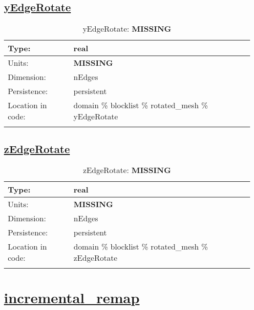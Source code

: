 \subsection[yEdgeRotate]{\hyperref[sec:var_tab_rotated_mesh]{yEdgeRotate}}
\label{subsec:var_sec_rotated_mesh_yEdgeRotate}
\begin{center}
\begin{longtable}{| p{2.0in} | p{4.0in} |}
        \hline 
        Type: & real \\
        \hline 
        Units: & {\bf \color{red} MISSING} \\
        \hline 
        Dimension: & nEdges \\
        \hline 
        Persistence: & persistent \\
        \hline 
         Location in code: & domain \% blocklist \% rotated\_mesh \% yEdgeRotate \\
         \hline 
    \caption{yEdgeRotate: {\bf \color{red} MISSING}}
\end{longtable}
\end{center}
\subsection[zEdgeRotate]{\hyperref[sec:var_tab_rotated_mesh]{zEdgeRotate}}
\label{subsec:var_sec_rotated_mesh_zEdgeRotate}
\begin{center}
\begin{longtable}{| p{2.0in} | p{4.0in} |}
        \hline 
        Type: & real \\
        \hline 
        Units: & {\bf \color{red} MISSING} \\
        \hline 
        Dimension: & nEdges \\
        \hline 
        Persistence: & persistent \\
        \hline 
         Location in code: & domain \% blocklist \% rotated\_mesh \% zEdgeRotate \\
         \hline 
    \caption{zEdgeRotate: {\bf \color{red} MISSING}}
\end{longtable}
\end{center}
\section[incremental\_remap]{\hyperref[sec:var_tab_incremental_remap]{incremental\_remap}}
\label{sec:var_sec_incremental_remap}
